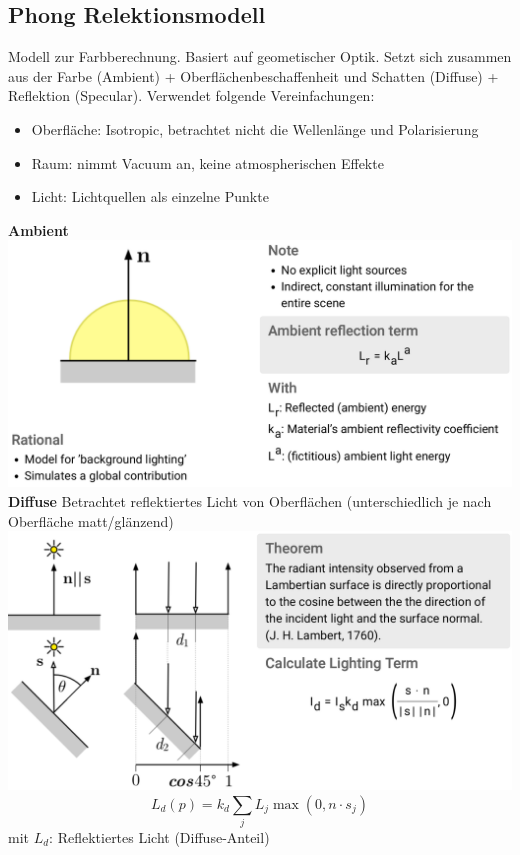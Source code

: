 \documentclass[12pt]{article}
\begin{document}
	\subsection{Phong Relektionsmodell}
	Modell zur Farbberechnung. Basiert auf geometischer Optik. Setzt sich zusammen aus der Farbe (Ambient) + Oberflächenbeschaffenheit und Schatten (Diffuse) + Reflektion (Specular). Verwendet folgende Vereinfachungen:
	\begin{itemize}
		\item Oberfläche: Isotropic, betrachtet nicht die Wellenlänge und Polarisierung
		\item Raum: nimmt Vacuum an, keine atmospherischen Effekte
		\item Licht: Lichtquellen als einzelne Punkte
	\end{itemize}
	\textbf{Ambient}\\
	\includegraphics[width=\linewidth]{figures/phong-ambient.png}\\
	\textbf{Diffuse} Betrachtet reflektiertes Licht von Oberflächen (unterschiedlich je nach Oberfläche matt/glänzend)\\
	\includegraphics[width=\linewidth]{figures/phong-diffuse.png}
	$$L_d(p) = k_d \sum_j L_j \max(0, n \cdot s_j)$$
	mit $L_d$: Reflektiertes Licht (Diffuse-Anteil)\\
\end{document}
